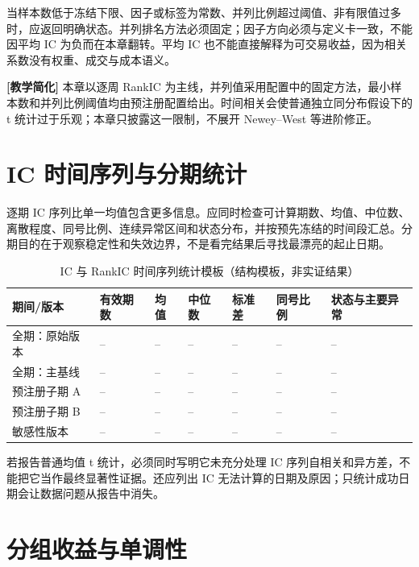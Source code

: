 当样本数低于冻结下限、因子或标签为常数、并列比例超过阈值、非有限值过多时，应返回明确状态。并列排名方法必须固定；因子方向必须与定义卡一致，不能因平均 IC 为负而在本章翻转。平均 IC 也不能直接解释为可交易收益，因为相关系数没有权重、成交与成本语义。

\begin{teachingbox}
\textbf{[教学简化]} 本章以逐周 RankIC 为主线，并列值采用配置中的固定方法，最小样本数和并列比例阈值均由预注册配置给出。时间相关会使普通独立同分布假设下的 t 统计过于乐观；本章只披露这一限制，不展开 Newey--West 等进阶修正。
\end{teachingbox}

\section{IC 时间序列与分期统计}

逐期 IC 序列比单一均值包含更多信息。应同时检查可计算期数、均值、中位数、离散程度、同号比例、连续异常区间和状态分布，并按预先冻结的时间段汇总。分期目的在于观察稳定性和失效边界，不是看完结果后寻找最漂亮的起止日期。

\begin{table}[htbp]
  \centering
  \small
  \caption{IC 与 RankIC 时间序列统计模板（结构模板，非实证结果）}
  \label{tab:ch06-ic-template}
  \begin{tabularx}{\textwidth}{p{2.3cm} p{1.5cm} p{1.4cm} p{1.4cm} p{1.5cm} p{1.8cm} Y}
    \toprule
    期间/版本 & 有效期数 & 均值 & 中位数 & 标准差 & 同号比例 & 状态与主要异常 \\
    \midrule
    全期：原始版本 & -- & -- & -- & -- & -- & -- \\
    全期：主基线 & -- & -- & -- & -- & -- & -- \\
    预注册子期 A & -- & -- & -- & -- & -- & -- \\
    预注册子期 B & -- & -- & -- & -- & -- & -- \\
    敏感性版本 & -- & -- & -- & -- & -- & -- \\
    \bottomrule
  \end{tabularx}
\end{table}

若报告普通均值 t 统计，必须同时写明它未充分处理 IC 序列自相关和异方差，不能把它当作最终显著性证据。还应列出 IC 无法计算的日期及原因；只统计成功日期会让数据问题从报告中消失。

\section{分组收益与单调性}


